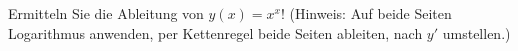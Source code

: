 \item Ermitteln Sie die Ableitung von $y(x)=x^x$! (Hinweis: Auf beide Seiten Logarithmus anwenden, per Kettenregel beide Seiten ableiten, nach $y'$ umstellen.)